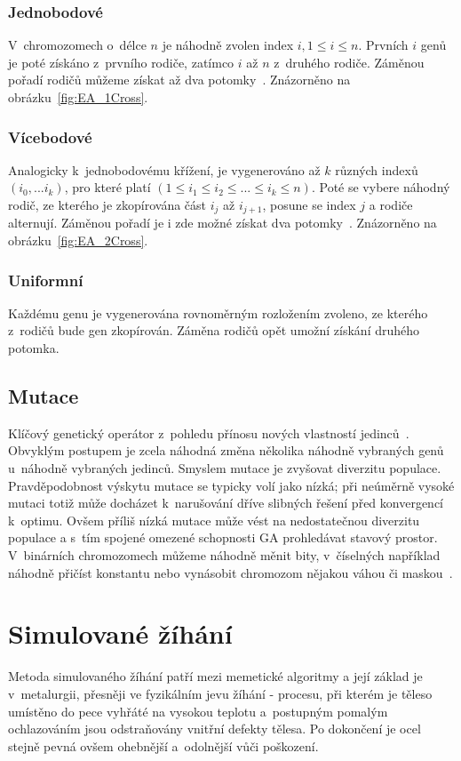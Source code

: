 \subsubsection*{Jednobodové}
V~chromozomech o~délce $n$ je náhodně zvolen index $i, 1 \leq i \leq n$. Prvních $i$ genů je poté získáno z~prvního rodiče, zatímco $i$ až $n$ z~druhého rodiče. Záměnou pořadí rodičů můžeme získat až dva potomky~\cite{Chlebik2017}. Znázorněno na obrázku~\ref{fig:EA_1Cross}.

\subsubsection*{Vícebodové}
Analogicky k~jednobodovému křížení, je vygenerováno až $k$ různých indexů $(i_0, ... i_k)$, pro které platí $(1 \leq i_1 \le i_2 \le ... \le i_k \le n)$. Poté se vybere náhodný rodič, ze kterého je zkopírována část $i_j$ až $i_{j+1}$, posune se index $j$ a rodiče alternují. Záměnou pořadí je i zde možné získat dva potomky~\cite{Chlebik2017}. Znázorněno na obrázku~\ref{fig:EA_2Cross}.
 
\subsubsection*{Uniformní}
Každému genu je vygenerována rovnoměrným rozložením zvoleno, ze kterého z~rodičů bude gen zkopírován. Záměna rodičů opět umožní získání druhého potomka.


\subsection{Mutace}
Klíčový genetický operátor z~pohledu přínosu nových vlastností jedinců~\cite{EVO, Weisser2010}. Obvyklým postupem je zcela náhodná změna několika náhodně vybraných genů u~náhodně vybraných jedinců. Smyslem mutace je zvyšovat diverzitu populace. Pravděpodobnost výskytu mutace se typicky volí jako nízká; při neúměrně vysoké mutaci totiž může docházet k~narušování dříve slibných řešení před konvergencí k~optimu. Ovšem příliš nízká mutace může vést na nedostatečnou diverzitu populace a s~tím spojené omezené schopnosti GA prohledávat stavový prostor.
V~binárních chromozomech můžeme náhodně měnit bity, v~číselných například náhodně přičíst konstantu nebo vynásobit chromozom nějakou váhou či maskou~\cite{Chlebik2017}.

\section{Simulované žíhání}
\label{alg:sa}
Metoda simulovaného žíhání patří mezi memetické algoritmy a její základ je v~metalurgii, přesněji ve fyzikálním jevu žíhání - procesu, při kterém je těleso umístěno do pece vyhřáté na vysokou teplotu a~postupným pomalým ochlazováním jsou odstraňovány vnitřní defekty tělesa. Po dokončení je ocel stejně pevná ovšem ohebnější a~odolnější vůči poškození.


